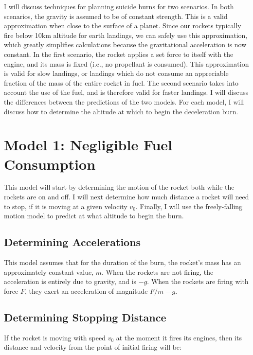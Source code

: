 \documentclass{article}
\begin{document}
I will discuss techniques for planning suicide burns for two scenarios.
In both scenarios, the gravity is assumed to be of constant strength.
This is a valid approximation when close to the surface of a planet.
Since our rockets typically fire below 10km altitude for earth landings,
	we can safely use this approximation, which greatly simplifies
	calculations because the gravitational acceleration is now constant.
In the first scenario, the rocket applies a set force to itself with the engine,
	and its mass is fixed (i.e., no propellant is consumed).
This approximation is valid for slow landings, or landings which do not 
	consume an appreciable fraction of the mass of the entire rocket
	in fuel.
The second scenario takes into account the use of the fuel, and is therefore
	valid for faster landings.
I will discuss the differences between the predictions of the two models.
For each model, I will discuss how to determine the altitude at which
	to begin the deceleration burn.

\section{Model 1: Negligible Fuel Consumption}

This model will start by determining the motion of the rocket both while
	the rockets are on and off.
I will next determine how much distance a rocket will need to stop, if it is
	moving at a given velocity $v_0$.
Finally, I will use the freely-falling motion model to predict at what altitude
	to begin the burn.

\subsection{Determining Accelerations}

This model assumes that for the duration of the burn, 
	the rocket's mass has an approximately constant value, $m$.
When the rockets are not firing, the acceleration is entirely due to gravity,
	and is $-g$.
When the rockets are firing with force $F$, they exert an acceleration
	of magnitude $F / m - g$.

\subsection{Determining Stopping Distance}

If the rocket is moving with speed $v_0$ at the moment it fires its engines,
	then its distance and velocity from the point of initial firing will be:
\end{document}
